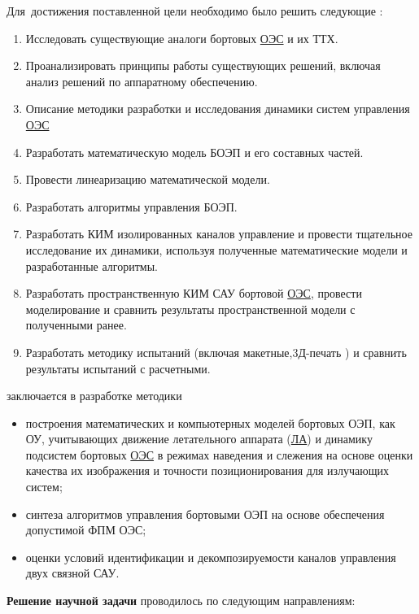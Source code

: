 Для~достижения поставленной цели необходимо было решить следующие {\tasks}:
\begin{enumerate}
  \item Исследовать существующие аналоги бортовых  \hyperref[acroEOS]{ОЭС} и их ТТХ.
  \item Проанализировать принципы работы существующих решений, включая анализ решений по аппаратному обеспечению.
  \item Описание методики разработки и исследования динамики систем управления \hyperref[acroEOS]{ОЭС}
  \item Разработать математическую модель БОЭП и его составных частей.
  \item Провести линеаризацию математической модели.
  \item Разработать алгоритмы управления БОЭП.
  \item Разработать КИМ изолированных каналов управление и провести тщательное исследование их динамики, используя полученные математические модели и разработанные алгоритмы.
  \item Разработать пространственную КИМ САУ бортовой \hyperref[acroEOS]{ОЭС}, провести моделирование и сравнить результаты пространственной модели с полученными ранее.
  \item Разработать методику испытаний (включая макетные,3Д-печать ) и сравнить результаты испытаний с  расчетными.
\end{enumerate}


{\novelty} заключается в разработке методики
\begin{itemize}
  \item построения математических и компьютерных моделей бортовых ОЭП, как ОУ, учитывающих движение летательного аппарата (\hyperref[acroLA]{ЛА}) и динамику подсистем бортовых  \hyperref[acroEOS]{ОЭС} в режимах наведения и слежения на основе оценки качества их изображения и точности позиционирования для излучающих систем;
  \item синтеза алгоритмов управления бортовыми ОЭП на основе обеспечения допустимой ФПМ ОЭС;
  \item оценки условий идентификации и декомпозируемости каналов управления двух связной САУ.
 
\end{itemize}

\textbf{Решение научной задачи} проводилось по следующим направлениям:

